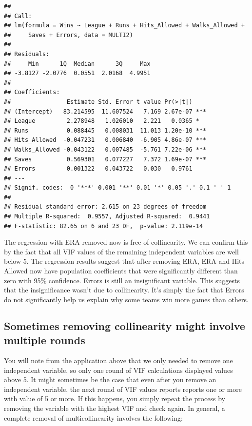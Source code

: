 \documentclass[
]{book}
\begin{document}
\begin{verbatim}
## 
## Call:
## lm(formula = Wins ~ League + Runs + Hits_Allowed + Walks_Allowed + 
##     Saves + Errors, data = MULTI2)
## 
## Residuals:
##     Min      1Q  Median      3Q     Max 
## -3.8127 -2.0776  0.0551  2.0168  4.9951 
## 
## Coefficients:
##                Estimate Std. Error t value Pr(>|t|)    
## (Intercept)   83.214595  11.607524   7.169 2.67e-07 ***
## League         2.278948   1.026010   2.221   0.0365 *  
## Runs           0.088445   0.008031  11.013 1.20e-10 ***
## Hits_Allowed  -0.047231   0.006840  -6.905 4.86e-07 ***
## Walks_Allowed -0.043122   0.007485  -5.761 7.22e-06 ***
## Saves          0.569301   0.077227   7.372 1.69e-07 ***
## Errors         0.001322   0.043722   0.030   0.9761    
## ---
## Signif. codes:  0 '***' 0.001 '**' 0.01 '*' 0.05 '.' 0.1 ' ' 1
## 
## Residual standard error: 2.615 on 23 degrees of freedom
## Multiple R-squared:  0.9557, Adjusted R-squared:  0.9441 
## F-statistic: 82.65 on 6 and 23 DF,  p-value: 2.119e-14
\end{verbatim}

The regression with ERA removed now is free of collinearity. We can confirm this by the fact that all VIF values of the remaining independent variables are well below 5. The regression results suggest that after removing ERA, ERA and Hits Allowed now have population coefficients that were significantly different than zero with 95\% confidence. Errors is still an insignificant variable. This suggests that the insignificance wasn't due to collinearity. It's simply the fact that Errors do not significantly help us explain why some teams win more games than others.

\hypertarget{sometimes-removing-collinearity-might-involve-multiple-rounds}{%
\subsection*{Sometimes removing collinearity might involve multiple rounds}\label{sometimes-removing-collinearity-might-involve-multiple-rounds}}

You will note from the application above that we only needed to remove one independent variable, so only one round of VIF calculations displayed values above 5. It might sometimes be the case that even after you remove an independent variable, the next round of VIF values reports reports one or more with value of 5 or more. If this happens, you simply repeat the process by removing the variable with the highest VIF and check again. In general, a complete removal of multicollinearity involves the following:
\end{document}

